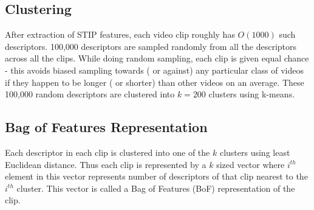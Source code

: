 \subsection{Clustering}
After extraction of STIP features, each video clip roughly has $O(1000)$ such descriptors.
100,000 descriptors are sampled randomly from all the descriptors across all the clips.
While doing random sampling, each clip is given equal chance - this avoids biased sampling
towards ( or against) any particular class of videos if they happen to be longer ( or shorter) than other videos on an average.
These 100,000 random descriptors are clustered into $k = 200$ clusters using k-means.

\subsection{Bag of Features Representation}
Each descriptor in each clip is clustered into one of the $k$ clusters using
least Euclidean distance. Thus each clip is represented by a $k$ sized vector
where $i^{th}$ element in this vector represents number of descriptors of that clip 
nearest to the $i^{th}$ cluster. This vector is called a Bag of Features (BoF)
representation of the clip.

\begin{comment}
\begin{table}[t]
\centering
\begin{tabular}{| l | c |}
\hline
{\bf Activity Class} & {\bf Average Precision} \\ \hline
%
AnswerPhone & 11.36\% \\ \hline
DriveCar & 66.96\% \\ \hline
Eat & 45.45\% \\ \hline
FightPerson & 57.63\% \\ \hline
GetOutCar & 17.86\% \\ \hline
HandShake & 25.93\% \\ \hline
HugPerson & 15.15\% \\ \hline
Kiss & 18.18\% \\ \hline
Run & 38.78\% \\ \hline
SitDown & 40.96\% \\ \hline
SitUp & 5.26\% \\ \hline
StandUp & 35.20\% \\ \hline
Average AP & 31.56\% \\ \hline
%
\end{tabular}
\caption{Average precision for classification using only video features}
\label{table:AP_OnlyAction}
\end{table}
\end{comment}

